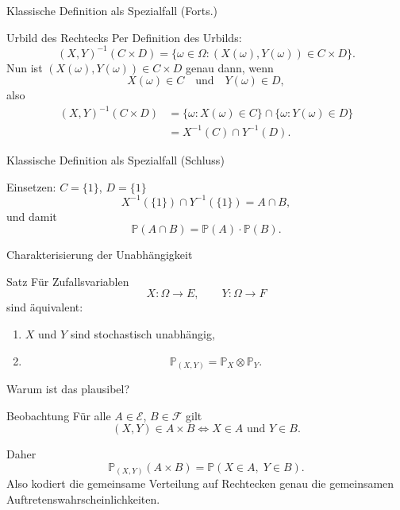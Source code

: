 \documentclass{beamer}
\begin{document}
\begin{frame}{Klassische Definition als Spezialfall (Forts.)}
\begin{block}{Urbild des Rechtecks}
Per Definition des Urbilds:
\[
(X,Y)^{-1}(C\times D)=\{\omega\in\Omega : (X(\omega),Y(\omega))\in C\times D\}.
\]
Nun ist \((X(\omega),Y(\omega))\in C\times D\) genau dann, wenn
\[
X(\omega)\in C \quad\text{und}\quad Y(\omega)\in D,
\]
also
\begin{align*}
(X,Y)^{-1}(C\times D)
&=\{\omega: X(\omega)\in C\}\cap\{\omega: Y(\omega)\in D\}\\
&=X^{-1}(C)\cap Y^{-1}(D).
\end{align*}
\end{block}
\end{frame}

\begin{frame}{Klassische Definition als Spezialfall (Schluss)}
\begin{block}{Einsetzen: \(C=\{1\}\), \(D=\{1\}\)}
\[
X^{-1}(\{1\})\cap Y^{-1}(\{1\})=A\cap B,
\]
und damit
\[
\mathbb P(A\cap B)=\mathbb P(A)\cdot\mathbb P(B).
\]
\end{block}
\end{frame}

\begin{frame}{Charakterisierung der Unabhängigkeit}
\begin{block}{Satz}
Für Zufallsvariablen
\[
X\colon \Omega\to E,\qquad Y\colon \Omega\to F
\]
sind äquivalent:
\begin{enumerate}
    \item \(X\) und \(Y\) sind stochastisch unabhängig,
    \item
    \[
    \mathbb P_{(X,Y)}=\mathbb P_X\otimes\mathbb P_Y.
    \]
\end{enumerate}
\end{block}
\end{frame}

\begin{frame}{Warum ist das plausibel?}
\begin{block}{Beobachtung}
Für alle \(A\in\mathcal E\), \(B\in\mathcal F\) gilt
\[
(X,Y)\in A\times B
\iff
X\in A \text{ und } Y\in B.
\]
\end{block}

\begin{block}{Daher}
\[
\mathbb P_{(X,Y)}(A\times B)
=
\mathbb P(X\in A,\;Y\in B).
\]
Also kodiert die gemeinsame Verteilung auf Rechtecken genau die gemeinsamen Auftretenswahrscheinlichkeiten.
\end{block}
\end{frame}
\end{document}

